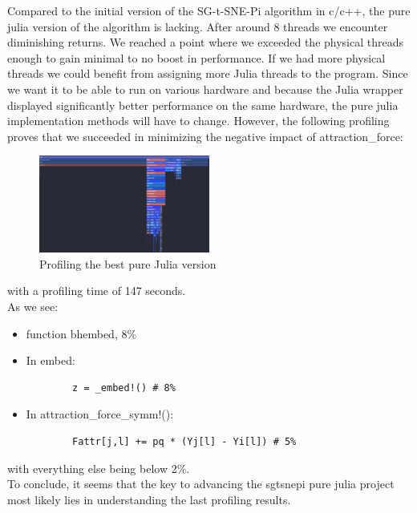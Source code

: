 Compared to the initial version of the SG-t-SNE-Pi algorithm in c/c++, the pure julia version of the algorithm 
is lacking. After around 8 threads we encounter diminishing returns. We reached a point where we exceeded 
the physical threads enough to gain minimal to no boost in performance. If we had more physical threads 
we could benefit from assigning more Julia threads to the program. Since we want it to be able to 
run on various hardware and because the Julia wrapper displayed significantly better performance on the same 
hardware, the pure julia implementation methods will have to change. However, the following profiling proves
that we succeeded in minimizing the negative impact of attraction\_force:
\begin{figure}[H]
    \includegraphics[width=0.5\textwidth]{media/bhembedProfiling.png}
    \caption{Profiling the best pure Julia version}
\end{figure}
with a profiling time of 147 seconds. \\

As we see:
\begin{itemize}
    \item function bhembed, 8\%
    
    \item In embed:
    \begin{verbatim}
        z = _embed!() # 8%
    \end{verbatim}

    \item In attraction\_force\_symm!(): 
    \begin{verbatim}
        Fattr[j,l] += pq * (Yj[l] - Yi[l]) # 5%
    \end{verbatim}
\end{itemize}
with everything else being below 2\%. \\

To conclude, it seems that the key to advancing the sgtsnepi pure julia project most likely lies in 
understanding the last profiling results.